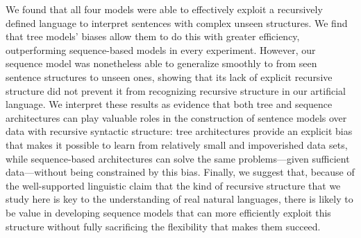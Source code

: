 We found that all four models were able to effectively exploit a recursively defined language to interpret sentences with complex unseen structures.
We find that tree models' biases allow them to do this with greater efficiency, outperforming sequence-based models in every experiment. However, our sequence model was nonetheless able to generalize smoothly to from seen sentence structures to unseen ones, showing that its lack of explicit recursive structure did not prevent it from recognizing recursive structure in our artificial language. 
We interpret these results as evidence that both tree and sequence architectures can play valuable roles in the construction of sentence models over data with recursive syntactic structure: tree architectures provide an explicit bias that makes it possible to learn from relatively small and impoverished data sets, while sequence-based architectures can solve the same problems---given sufficient data---without being constrained by this bias. Finally, we suggest that, because of the well-supported linguistic claim that the kind of recursive structure that we study here is key to the understanding of real natural languages, there is likely to be value in developing sequence models that can more efficiently exploit this structure without fully sacrificing the flexibility that makes them succeed.

